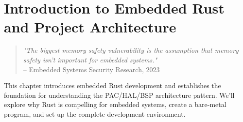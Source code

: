 
\chapter{Introduction to Embedded Rust and Project Architecture}
\label{ch:chapter-01}

\begin{quote}
    \textit{"The biggest memory safety vulnerability is the assumption that memory safety isn't important for embedded systems."}
    \\
    -- Embedded Systems Security Research, 2023
\end{quote}

This chapter introduces embedded Rust development and establishes the foundation for understanding the PAC/HAL/BSP architecture pattern. We'll explore why Rust is compelling for embedded systems, create a bare-metal program, and set up the complete development environment.

\minitoc

\clearpage











